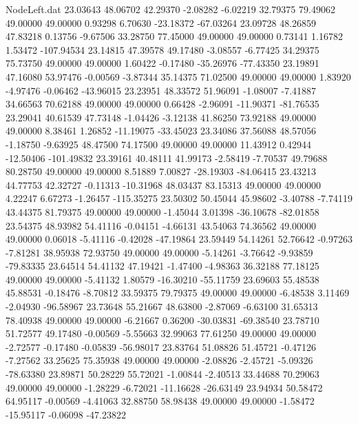 \begin{filecontents}{NodeLeft.dat}
  23.03643   48.06702   42.29370    -2.08282   -6.02219   32.79375   79.49062   49.00000   49.00000    0.93298    6.70630  -23.18372  -67.03264
  23.09728   48.26859   47.83218     0.13756   -9.67506   33.28750   77.45000   49.00000   49.00000    0.73141    1.16782    1.53472 -107.94534
  23.14815   47.39578   49.17480    -3.08557   -6.77425   34.29375   75.73750   49.00000   49.00000    1.60422   -0.17480  -35.26976  -77.43350
  23.19891   47.16080   53.97476    -0.00569   -3.87344   35.14375   71.02500   49.00000   49.00000    1.83920   -4.97476   -0.06462  -43.96015
  23.23951   48.33572   51.96091    -1.08007   -7.41887   34.66563   70.62188   49.00000   49.00000    0.66428   -2.96091  -11.90371  -81.76535
  23.29041   40.61539   47.73148    -1.04426   -3.12138   41.86250   73.92188   49.00000   49.00000    8.38461    1.26852  -11.19075  -33.45023
  23.34086   37.56088   48.57056    -1.18750   -9.63925   48.47500   74.17500   49.00000   49.00000   11.43912    0.42944  -12.50406 -101.49832
  23.39161   40.48111   41.99173    -2.58419   -7.70537   49.79688   80.28750   49.00000   49.00000    8.51889    7.00827  -28.19303  -84.06415
  23.43213   44.77753   42.32727    -0.11313  -10.31968   48.03437   83.15313   49.00000   49.00000    4.22247    6.67273   -1.26457 -115.35275
  23.50302   50.45044   45.98602    -3.40788   -7.74119   43.44375   81.79375   49.00000   49.00000   -1.45044    3.01398  -36.10678  -82.01858
  23.54375   48.93982   54.41116    -0.04151   -4.66131   43.54063   74.36562   49.00000   49.00000    0.06018   -5.41116   -0.42028  -47.19864
  23.59449   54.14261   52.76642    -0.97263   -7.81281   38.95938   72.93750   49.00000   49.00000   -5.14261   -3.76642   -9.93859  -79.83335
  23.64514   54.41132   47.19421    -1.47400   -4.98363   36.32188   77.18125   49.00000   49.00000   -5.41132    1.80579  -16.30210  -55.11759
  23.69603   55.48538   45.88531    -0.18476   -8.70812   33.59375   79.79375   49.00000   49.00000   -6.48538    3.11469   -2.04930  -96.58967
  23.73648   55.21667   48.63800    -2.87069   -6.63100   31.65313   78.40938   49.00000   49.00000   -6.21667    0.36200  -30.03831  -69.38540
  23.78710   51.72577   49.17480    -0.00569   -5.55663   32.99063   77.61250   49.00000   49.00000   -2.72577   -0.17480   -0.05839  -56.98017
  23.83764   51.08826   51.45721    -0.47126   -7.27562   33.25625   75.35938   49.00000   49.00000   -2.08826   -2.45721   -5.09326  -78.63380
  23.89871   50.28229   55.72021    -1.00844   -2.40513   33.44688   70.29063   49.00000   49.00000   -1.28229   -6.72021  -11.16628  -26.63149
  23.94934   50.58472   64.95117    -0.00569   -4.41063   32.88750   58.98438   49.00000   49.00000   -1.58472  -15.95117   -0.06098  -47.23822

\end{filecontents}
